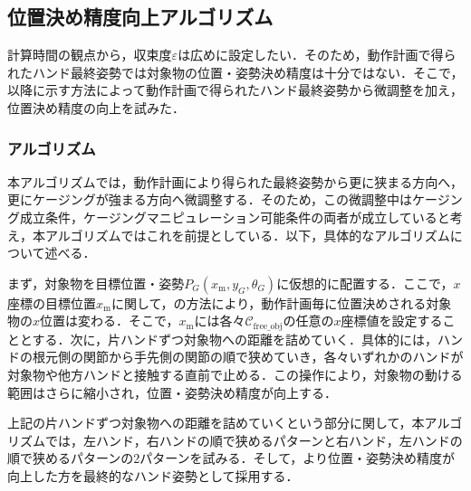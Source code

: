 \documentclass[a4paper,twoside,12pt,papersize, dvipdfmx]{iirthesis}
\begin{document}
\subsection{位置決め精度向上アルゴリズム}{\label{subsec::planner::formclosure}
計算時間の観点から，収束度$\varepsilon$は広めに設定したい．そのため，動作計画で得られたハンド最終姿勢では対象物の位置・姿勢決め精度は十分ではない．そこで，以降に示す方法によって動作計画で得られたハンド最終姿勢から微調整を加え，位置決め精度の向上を試みた．
\subsubsection{アルゴリズム}
本アルゴリズムでは，動作計画により得られた最終姿勢から更に狭まる方向へ，更にケージングが強まる方向へ微調整する．そのため，この微調整中はケージング成立条件，ケージングマニピュレーション可能条件の両者が成立していると考え，本アルゴリズムではこれを前提としている．以下，具体的なアルゴリズムについて述べる．\par
まず，対象物を目標位置・姿勢$P_G (x_{\mathrm m}, y_G, \theta_G)$に仮想的に配置する．ここで，$x$座標の目標位置$x_{\mathrm m}$に関して，の方法により，動作計画毎に位置決めされる対象物の$x$位置は変わる．そこで，$x_{\mathrm m}$には各々$\mathcal{C}_{\mathrm{free\_obj}}$の任意の$x$座標値を設定することとする．次に，片ハンドずつ対象物への距離を詰めていく．具体的には，ハンドの根元側の関節から手先側の関節の順で狭めていき，各々いずれかのハンドが対象物や他方ハンドと接触する直前で止める．この操作により，対象物の動ける範囲はさらに縮小され，位置・姿勢決め精度が向上する．\par
上記の片ハンドずつ対象物への距離を詰めていくという部分に関して，本アルゴリズムでは，左ハンド，右ハンドの順で狭めるパターンと右ハンド，左ハンドの順で狭めるパターンの2パターンを試みる．そして，より位置・姿勢決め精度が向上した方を最終的なハンド姿勢として採用する．

}
\end{document}
